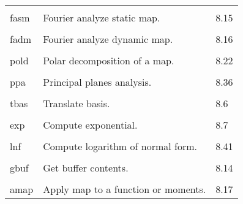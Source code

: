 \begin{center}
\begin{tabular}{lll}
\vspace{-3mm}& &\\
\hspace{1.5em}fasm    &           Fourier analyze static map.    &  \hspace{2em}8.15\\
\vspace{-3mm}& &\\
\hspace{1.5em}fadm    &           Fourier analyze dynamic map.   &  \hspace{2em}8.16\\
\vspace{-3mm}& &\\
\hspace{1.5em}pold    &           Polar decomposition of a map.  & \hspace{2em}8.22\\
\vspace{-3mm}& &\\
\hspace{1.5em}ppa    &         Principal planes analysis.  & \hspace{2em}8.36\\
\vspace{-3mm}& &\\
\hspace{1.5em}tbas    &           Translate basis.               &  \hspace{2em}8.6\\
\vspace{-3mm}& &\\
\hspace{1.5em}exp     &           Compute exponential.           &  \hspace{2em}8.7\\
\vspace{-3mm}& &\\
\hspace{1.5em}lnf     &           Compute logarithm of normal
form.           &  \hspace{2em}8.41\\
\vspace{-3mm}& &\\
\hspace{1.5em}gbuf    &           Get buffer contents.           &  \hspace{2em}8.14\\
\vspace{-3mm}& &\\
\hspace{1.5em}amap    &     Apply map to a function or moments.  &   \hspace{2em}8.17\\

\end{tabular}
\end{center}

